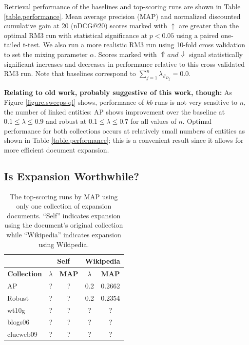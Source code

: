 \documentclass{article}
\begin{document}
Retrieval performance of the baselines and top-scoring runs are shown in Table \ref{table.performance}. Mean average precision (MAP) and normalized discounted cumulative gain at 20 (nDCG@20) scores marked with $\uparrow$ are greater than the optimal RM3 run with statistical significance at $p < 0.05$ using a paired one-tailed t-test. We also run a more realistic RM3 run using 10-fold cross validation to set the mixing parameter $\alpha$. Scores marked with $\Uparrow and \Downarrow$ signal statistically significant increases and decreases in performance relative to this cross validated RM3 run. Note that baselines correspond to $\sum_{j=1}^n \lambda_{{\mathcal{E}_D}_j} = 0.0$. 

\textbf{Relating to old work, probably suggestive of this work, though:} As Figure \ref{figure.sweeps-ql} shows, performance of \textit{kb} runs is not very sensitive to $n$, the number of linked entities: AP shows improvement over the baseline at $0.1 \leq \lambda \leq 0.9$ and robust at $0.1 \leq \lambda \leq 0.7$ for all values of $n$. Optimal performance for both collections occurs at relatively small numbers of entities as shown in Table \ref{table.performance}; this is a convenient result since it allows for more efficient document expansion.

\subsection{Is Expansion Worthwhile?}\label{section.results.expansion}

\begin{table}[htbp]
\centering
\begin{tabular}{|l|c|c|c|c|} \hline
& \multicolumn{2}{c}{Self} & \multicolumn{2}{|c|}{Wikipedia} \\ \hline
{\bf Collection} & {\bf $\lambda$} & {\bf MAP} & {\bf $\lambda$} & {\bf MAP} \\ \hline
AP & ? & ? & 0.2 & 0.2662 \\ \hline
Robust & ? & ? & 0.2 & 0.2354 \\ \hline
wt10g & ? & ? & ? & ? \\ \hline
blogs06 & ? & ? & ? & ? \\ \hline
clueweb09 & ? & ? & ? & ? \\ \hline
\end{tabular}
\caption{The top-scoring runs by MAP using only one collection of expansion documents. ``Self'' indicates expansion using the document's original collection while ``Wikipedia'' indicates expansion using Wikipedia.}
\label{table.performance.single}
\end{table}
\end{document}
